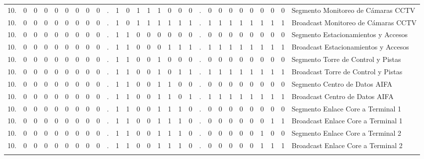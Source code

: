 \begin{center}
{\begin{tabular}{r cccccccc c cccccccc c cccccccc l}
10. & 0 & 0 & 0 & 0 & 0 & 0 & 0 & 0 & . & 1 & 0 & 1 & 1 & \multicolumn{1}{c|}{1} & 0 & 0 & 0 & . & 0 & 0 & 0 & 0 & 0 & 0 & 0 & 0 & Segmento Monitoreo de Cámaras CCTV \\
10. & 0 & 0 & 0 & 0 & 0 & 0 & 0 & 0 & . & 1 & 0 & 1 & 1 & \multicolumn{1}{c|}{1} & 1 & 1 & 1 & . & 1 & 1 & 1 & 1 & 1 & 1 & 1 & 1 & Broadcast Monitoreo de Cámaras CCTV \\
\addlinespace

10. & 0 & 0 & 0 & 0 & 0 & 0 & 0 & 0 & . & 1 & 1 & 0 & 0 & \multicolumn{1}{c|}{0} & 0 & 0 & 0 & . & 0 & 0 & 0 & 0 & 0 & 0 & 0 & 0 & Segmento Estacionamientos y Accesos \\
10. & 0 & 0 & 0 & 0 & 0 & 0 & 0 & 0 & . & 1 & 1 & 0 & 0 & \multicolumn{1}{c|}{0} & 1 & 1 & 1 & . & 1 & 1 & 1 & 1 & 1 & 1 & 1 & 1 & Broadcast Estacionamientos y Accesos \\
\addlinespace

10. & 0 & 0 & 0 & 0 & 0 & 0 & 0 & 0 & . & 1 & 1 & 0 & 0 & 1 & \multicolumn{1}{c|}{0} & 0 & 0 & . & 0 & 0 & 0 & 0 & 0 & 0 & 0 & 0 & Segmento Torre de Control y Pistas \\
10. & 0 & 0 & 0 & 0 & 0 & 0 & 0 & 0 & . & 1 & 1 & 0 & 0 & 1 & \multicolumn{1}{c|}{0} & 1 & 1 & . & 1 & 1 & 1 & 1 & 1 & 1 & 1 & 1 & Broadcast Torre de Control y Pistas \\
\addlinespace

10. & 0 & 0 & 0 & 0 & 0 & 0 & 0 & 0 & . & 1 & 1 & 0 & 0 & 1 & 1 & \multicolumn{1}{c|}{0} & 0 & . & 0 & 0 & 0 & 0 & 0 & 0 & 0 & 0 & Segmento Centro de Datos AIFA \\
10. & 0 & 0 & 0 & 0 & 0 & 0 & 0 & 0 & . & 1 & 1 & 0 & 0 & 1 & 1 & \multicolumn{1}{c|}{0} & 1 & . & 1 & 1 & 1 & 1 & 1 & 1 & 1 & 1 & Broadcast Centro de Datos AIFA \\
\addlinespace

10. & 0 & 0 & 0 & 0 & 0 & 0 & 0 & 0 & . & 1 & 1 & 0 & 0 & 1 & 1 & 1 & 0 & . & 0 & 0 & 0 & 0 & 0 & \multicolumn{1}{c|}{0} & 0 & 0 & Segmento Enlace Core a Terminal 1 \\
10. & 0 & 0 & 0 & 0 & 0 & 0 & 0 & 0 & . & 1 & 1 & 0 & 0 & 1 & 1 & 1 & 0 & . & 0 & 0 & 0 & 0 & 0 & \multicolumn{1}{c|}{0} & 1 & 1 & Broadcast Enlace Core a Terminal 1 \\
\addlinespace

10. & 0 & 0 & 0 & 0 & 0 & 0 & 0 & 0 & . & 1 & 1 & 0 & 0 & 1 & 1 & 1 & 0 & . & 0 & 0 & 0 & 0 & 0 & \multicolumn{1}{c|}{1} & 0 & 0 & Segmento Enlace Core a Terminal 2 \\
10. & 0 & 0 & 0 & 0 & 0 & 0 & 0 & 0 & . & 1 & 1 & 0 & 0 & 1 & 1 & 1 & 0 & . & 0 & 0 & 0 & 0 & 0 & \multicolumn{1}{c|}{1} & 1 & 1 & Broadcast Enlace Core a Terminal 2 \\
\addlinespace


\end{tabular}}
\end{center}
